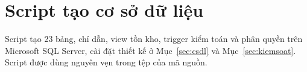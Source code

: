 \chapter{Script tạo cơ sở dữ liệu}
\label{app:csdl}

Script tạo 23 bảng, chỉ dẫn, view tồn kho, trigger kiểm toán và phân quyền trên Microsoft SQL Server, cài đặt thiết kế ở Mục~\ref{sec:csdl} và Mục~\ref{sec:kiemsoat}. Script được dùng nguyên vẹn trong tệp  của mã nguồn.

{\footnotesize

}
